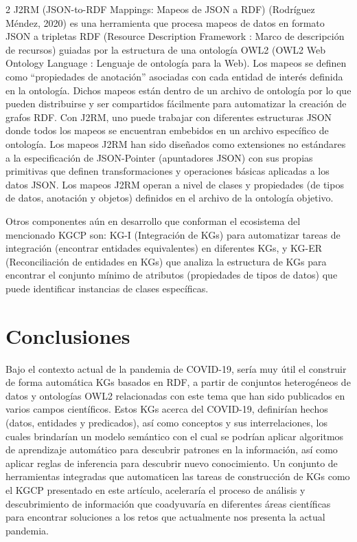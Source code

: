 \documentclass[12pt,spanish,Letterpaper,openany]{book}
\begin{document}
\begin {multicols}{2}
J2RM (JSON-to-RDF Mappings: Mapeos de JSON a RDF) (Rodríguez Méndez, 2020) es una herramienta que procesa mapeos de datos en formato JSON a tripletas RDF (Resource Description Framework : Marco de descripción de recursos) guiadas por la estructura de una ontología OWL2 (OWL2 Web Ontology Language : Lenguaje de ontología para la Web). Los mapeos se definen como ``propiedades de anotación'' asociadas con cada entidad de interés definida en la ontología. Dichos mapeos están dentro de un archivo de ontología por lo que pueden distribuirse y ser compartidos fácilmente para automatizar la creación de grafos RDF. Con J2RM, uno puede trabajar con diferentes estructuras JSON donde todos los mapeos se encuentran embebidos en un archivo específico de ontología. Los mapeos J2RM han sido diseñados como extensiones no estándares a la especificación de JSON-Pointer (apuntadores JSON) con sus propias primitivas que definen transformaciones y operaciones básicas aplicadas a los datos JSON. Los mapeos J2RM operan a nivel de clases y propiedades (de tipos de datos, anotación y objetos) definidos en el archivo de la ontología objetivo.

Otros componentes aún en desarrollo que conforman el ecosistema del mencionado KGCP son: KG-I (Integración de KGs) para automatizar tareas de integración (encontrar entidades equivalentes) en diferentes KGs, y KG-ER (Reconciliación de entidades en KGs) que analiza la estructura de KGs para encontrar el conjunto mínimo de atributos (propiedades de tipos de datos) que puede identificar instancias de clases específicas.

\hypertarget{conclusiones-4}{%
\section{Conclusiones}\label{conclusiones-4}}

Bajo el contexto actual de la pandemia de COVID-19, sería muy útil el construir de forma automática KGs basados en RDF, a partir de conjuntos heterogéneos de datos y ontologías OWL2 relacionadas con este tema que han sido publicados en varios campos científicos. Estos KGs acerca del COVID-19, definirían hechos (datos, entidades y predicados), así como conceptos y sus interrelaciones, los cuales brindarían un modelo semántico con el cual se podrían aplicar algoritmos de aprendizaje automático para descubrir patrones en la información, así como aplicar reglas de inferencia para descubrir nuevo conocimiento. Un conjunto de herramientas integradas que automaticen las tareas de construcción de KGs como el KGCP presentado en este artículo, aceleraría el proceso de análisis y descubrimiento de información que coadyuvaría en diferentes áreas científicas para encontrar soluciones a los retos que actualmente nos presenta la actual pandemia.


\end{multicols}
\end{document}
